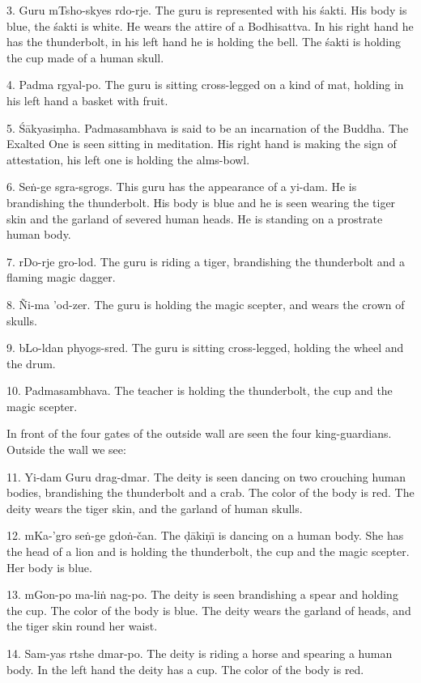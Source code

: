 \documentclass[a4paper, 12pt, oneside]{article}
\begin{document}
3. Guru mTsho-skyes rdo-rje. The guru is represented with his \'{s}akti. His body is blue, the \'{s}akti is white. He wears the attire of a Bodhisattva. In his right hand he has the thunderbolt, in his left hand he is holding the bell. The \'{s}akti is holding the cup made of a human skull.

4. Padma rgyal-po. The guru is sitting cross-legged on a kind of mat, holding in his left hand a basket with fruit.

5. \'{S}\={a}kyasi\d{m}ha. Padmasambhava is said to be an incarnation of the Buddha. The Exalted One is seen sitting in meditation. His right hand is making the sign of attestation, his left one is holding the alms-bowl.

6. Se\.{n}-ge sgra-sgrogs. This guru has the appearance of a yi-dam. He is brandishing the thunderbolt. His body is blue and he is seen wearing the tiger skin and the garland of severed human heads. He is standing on a prostrate human body.

7. rDo-rje gro-lod. The guru is riding a tiger, brandishing the thunderbolt and a flaming magic dagger.

8. Ñi-ma 'od-zer. The guru is holding the magic scepter, and wears the crown of skulls.

9. bLo-ldan phyogs-sred. The guru is sitting cross-legged, holding the wheel and the drum.

10. Padmasambhava. The teacher is holding the thunderbolt, the cup and the magic scepter.

In front of the four gates of the outside wall are seen the four king-guardians. Outside the wall we see:

11. Yi-dam Guru drag-dmar. The deity is seen dancing on two crouching human bodies, brandishing the thunderbolt and a crab. The color of the body is red. The deity wears the tiger skin, and the garland of human skulls.

12. mKa-'gro se\.{n}-ge gdo\.{n}-čan. The \d{d}\={a}ki\d{n}\={\i} is dancing on a human body. She has the head of a lion and is holding the thunderbolt, the cup and the magic scepter. Her body is blue.

13. mGon-po ma-li\.{n} nag-po. The deity is seen brandishing a spear and holding the cup. The color of the body is blue. The deity wears the garland of heads, and the tiger skin round her waist.

14. Sam-yas rtshe dmar-po. The deity is riding a horse and spearing a human body. In the left hand the deity has a cup. The color of the body is red.
\end{document}
